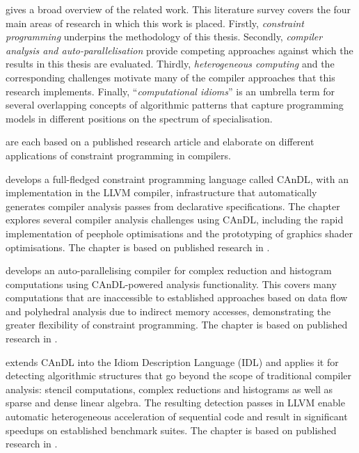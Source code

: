     {\bf{}} gives a broad overview of the related work.
    This literature survey covers the four main areas of research in which this
    work is placed.
    Firstly, {\em constraint programming} underpins the methodology of this
    thesis.
    Secondly, {\em compiler analysis and auto-parallelisation} provide
    competing approaches against which the results in this thesis are evaluated.
    Thirdly, {\em heterogeneous computing} and the corresponding challenges
    motivate many of the compiler approaches that this research implements.
    Finally, ``{\em computational idioms}'' is an umbrella term for several
    overlapping concepts of algorithmic patterns that capture programming models
    in different positions on the spectrum of specialisation.

    {\bf{}}
    are each based on a published research article and elaborate on different
    applications of constraint programming in compilers.

    {\bf{}} develops a full-fledged constraint programming
    language called CAnDL, with an implementation in the LLVM compiler,
    infrastructure that automatically generates compiler analysis passes from
    declarative specifications.
    The chapter explores several compiler analysis challenges using CAnDL,
    including the rapid implementation of peephole optimisations and the
    prototyping of graphics shader optimisations.
    The chapter is based on published research in
    \citet{Ginsbach:2018:CDS:3178372.3179515}.

    {\bf{}} develops an auto-parallelising compiler for
    complex reduction and histogram computations using CAnDL-powered analysis
    functionality.
    This covers many computations that are inaccessible to established
    approaches based on data flow and polyhedral analysis due to indirect memory
    accesses, demonstrating the greater flexibility of constraint programming.
    The chapter is based on published research in
    \citet{ginsbach2017discovery}.

    {\bf{}} extends CAnDL into the Idiom Description Language
    (IDL) and applies it for detecting algorithmic structures that go beyond the
    scope of traditional compiler analysis: stencil computations, complex
    reductions and histograms as well as sparse and dense linear algebra.
    The resulting detection passes in LLVM enable automatic heterogeneous
    acceleration of sequential code and result in significant speedups on
    established benchmark suites.
    The chapter is based on published research in
    \citet{Ginsbach:2018:AML:3173162.3173182}.
